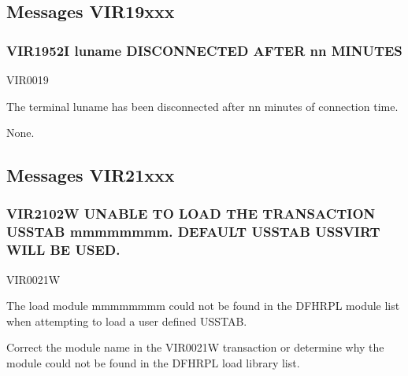 \documentclass[letterpaper,10pt,english]{sphinxmanual}
\begin{document}
\subsection{Messages VIR19xxx}
\label{\detokenize{messages:messages-vir19xxx}}

\subsubsection{VIR1952I luname DISCONNECTED AFTER nn MINUTES}
\label{\detokenize{messages:vir1952i-luname-disconnected-after-nn-minutes}}\begin{description}
\sphinxAtStartPar
VIR0019

\sphinxAtStartPar
The terminal luname has been disconnected after nn minutes of connection time.

\sphinxAtStartPar
None.

\end{description}


\subsection{Messages VIR21xxx}
\label{\detokenize{messages:messages-vir21xxx}}

\subsubsection{VIR2102W UNABLE TO LOAD THE TRANSACTION USSTAB mmmmmmmm. DEFAULT USSTAB USSVIRT WILL BE USED.}
\label{\detokenize{messages:vir2102w-unable-to-load-the-transaction-usstab-mmmmmmmm-default-usstab-ussvirt-will-be-used}}\begin{description}
\sphinxAtStartPar
VIR0021W

\sphinxAtStartPar
The load module mmmmmmmm could not be found in the DFHRPL module list when attempting to load a user defined USSTAB.

\sphinxAtStartPar
Correct the module name in the VIR0021W transaction or determine why the module could not be found in the DFHRPL load library list.

\end{description}
\end{document}

